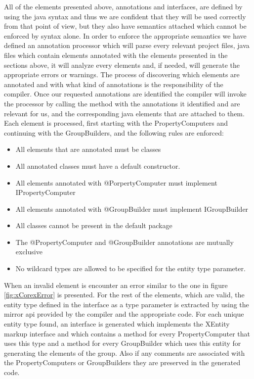 	All of the elements presented above, annotations and interfaces, are defined 
by using the java syntax and thus we are confident that they will be used
correctly from that point of view, but they also have semantics attached which
cannot be enforced by syntax alone. In order to enforce the appropriate
semantics we have defined an annotation processor which will parse every
relevant project files, java files which contain elements annotated with the
elements presented in the sections above, it will analyze every elements and, if
needed, will generate the appropriate  errors or warnings.
	The process of discovering which elements are annotated and with what kind of
annotations is the responsibility of the compiler. Once our requested
annotations are identified the compiler will invoke the processor by calling
the 
method with the annotations it identified and are relevant for us, and the
corresponding java elements that are attached to them. 
	Each element is processed, first starting with the PropertyComputers and
continuing with the GroupBuilders, and the following rules are enforced:
	
	\begin{itemize}
	  \item All elements that are annotated must be classes
	  \item All annotated classes must have a default constructor.
	  \item All elements annotated with @PorpertyComputer must implement
 IPropertyComputer
 	  \item All elements annotated with @GroupBuilder must implement
 IGroupBuilder
 	  \item  All classes cannot be present in the default package
 	  \item  The @PropertyComputer and @GroupBuilder annotations are mutually
exclusive
	  \item  No wildcard types are allowed to be specified for the entity type
 parameter.
	\end{itemize}
	When an invalid element is encounter an error similar to the one in figure
\ref{fig:xCorexError} is presented.
	For the rest of the elements, which are valid, the entity type defined in the
interface as a type parameter is extracted by using the mirror api provided by
the compiler and the appropriate code. For each unique entity type found, an
interface is generated which implements the XEntity markup interface and which
contains a method for every PropertyComputer that uses this type and a method
for every GroupBuilder which uses this entity for generating the elements of the
group. Also if any comments are associated with the PropertyComputers or
GroupBuilders they are preserved in the generated code. 
	
